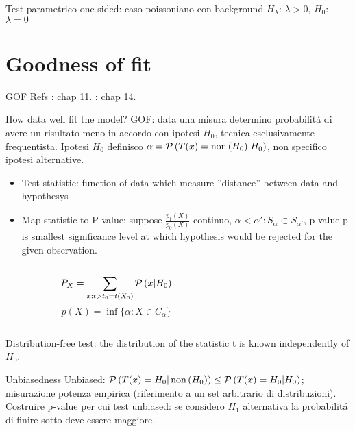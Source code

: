 \begin{frame}{Test parametrico one-sided: caso poissoniano con background}
$H_{\lambda}$: $\lambda>0$, $H_0$: $\lambda=0$
\end{frame}

\section{Goodness of fit}

\begin{wordonframe}{GOF Refs}
\cite{james2006statistical}: chap 11. \cite{lehmann2006testing}: chap 14.

\end{wordonframe}

\begin{frame}{How data well fit the model?}
GOF: data una misura determino probabilit\'a di avere un risultato meno in accordo con ipotesi $H_0$, tecnica esclusivamente frequentista.
Ipotesi $H_0$ definisco $\alpha=\operatorname{\mathcal{P}}{(T(x)=\operatorname{non}{(H_0)}|H_0)}$, non specifico ipotesi alternative.
\begin{itemize}
\item Test statistic: function of data which measure ''distance'' between data and hypothesys
\item Map statistic to P-value: suppose $\frac{p_1(X)}{p_0(X)}$ continuo, $\alpha<\alpha': S_{\alpha}\subset S_{\alpha'}$, p-value p is smallest significance level at which hypothesis would be rejected for the given observation.
\end{itemize}
\begin{columns}[T]
\begin{column}{0.5\textwidth}
\[P_X=\sum_{x:t>t_0=t(X_0)}\operatorname{\mathcal{P}}{(x|H_0)}\]
\[p(X)=\inf\{\alpha: X\in C_{\alpha}\}\]
\end{column}
\begin{column}{0.5\textwidth}

\end{column}
\end{columns}
Distribution-free test: the distribution of the statistic t is known independently of $H_0$.
\begin{block}{Unbiasedness}
Unbiased: $\operatorname{\mathcal{P}}{(T(x)=H_0|\operatorname{non}{(H_0)})}\leq\operatorname{\mathcal{P}}{(T(x)=H_0|H_0)}$; misurazione potenza empirica (riferimento a un set arbitrario di distribuzioni).
Costruire p-value per cui test unbiased: se considero $H_1$ alternativa la probabilit\'a di finire sotto deve essere maggiore.
\end{block}
\end{frame}

